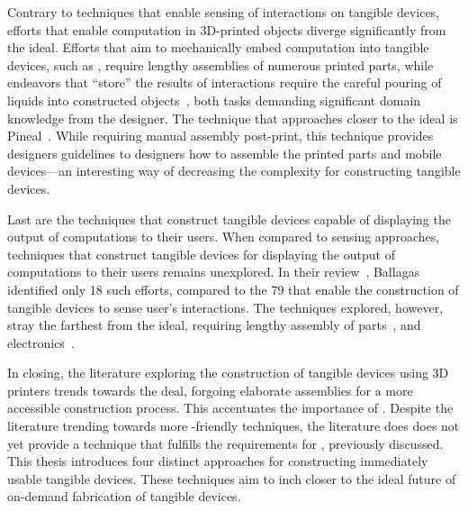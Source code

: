     Contrary to techniques that enable sensing of interactions on tangible
    devices, efforts that enable computation in 3D-printed objects diverge
    significantly from the \papf ideal. Efforts that aim to mechanically embed
    computation into tangible devices, such as \cite{Ion:2017}, require lengthy
    assemblies of numerous printed parts, while endeavors that ``store'' the
    results of interactions require the careful pouring of liquids into
    constructed objects~\cite{Schmitz:2018}, both tasks demanding significant
    domain knowledge from the designer. The technique that approaches closer to
    the \papf ideal is Pineal~\cite{Ledo:2017}. While requiring manual assembly
    post-print, this technique provides designers guidelines to designers how to
    assemble the printed parts and mobile devices---an interesting way of
    decreasing the complexity for constructing tangible devices.
    
    Last are the techniques that construct tangible devices capable of
    displaying the output of computations to their users. When compared to
    sensing approaches, techniques that construct tangible devices for
    displaying the output of computations to their users remains unexplored. In
    their review~\cite{Ballagas:2018}, Ballagas \etal identified only 18 such
    efforts, compared to the 79 that enable the construction of tangible devices
    to sense user's interactions. The techniques explored, however, stray the
    farthest from the \papf ideal, requiring lengthy assembly of
    parts~\cite{Ion:2017, Willis:2012}, and electronics~\cite{Murray-Smith:2008}.

    In closing, the literature exploring the construction of tangible devices
    using 3D printers trends towards the \papf deal, forgoing elaborate
    assemblies for a more accessible construction process. This accentuates the
    importance of \papf. Despite the literature trending towards more
    \pap-friendly techniques, the literature does does not yet provide a
    technique that fulfills the requirements for \papf, previously discussed.
    This thesis introduces four distinct approaches for constructing immediately
    usable tangible devices. These techniques aim to inch closer to the ideal
    future of on-demand fabrication of tangible devices.